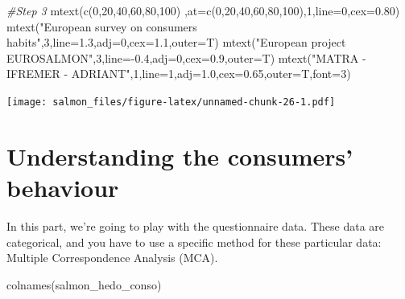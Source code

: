 \documentclass[
]{book}
\newenvironment{Shaded}{\begin{snugshade}}{\end{snugshade}}
\newcommand{\AttributeTok}[1]{\textcolor[rgb]{0.77,0.63,0.00}{#1}}
\newcommand{\CommentTok}[1]{\textcolor[rgb]{0.56,0.35,0.01}{\textit{#1}}}
\newcommand{\DecValTok}[1]{\textcolor[rgb]{0.00,0.00,0.81}{#1}}
\newcommand{\FloatTok}[1]{\textcolor[rgb]{0.00,0.00,0.81}{#1}}
\newcommand{\FunctionTok}[1]{\textcolor[rgb]{0.00,0.00,0.00}{#1}}
\newcommand{\NormalTok}[1]{#1}
\newcommand{\SpecialCharTok}[1]{\textcolor[rgb]{0.00,0.00,0.00}{#1}}
\newcommand{\StringTok}[1]{\textcolor[rgb]{0.31,0.60,0.02}{#1}}
\begin{document}
\begin{Shaded}
\begin{Highlighting}[]
\CommentTok{\#Step 3}
\FunctionTok{mtext}\NormalTok{(}\FunctionTok{c}\NormalTok{(}\DecValTok{0}\NormalTok{,}\DecValTok{20}\NormalTok{,}\DecValTok{40}\NormalTok{,}\DecValTok{60}\NormalTok{,}\DecValTok{80}\NormalTok{,}\DecValTok{100}\NormalTok{) ,}\AttributeTok{at=}\FunctionTok{c}\NormalTok{(}\DecValTok{0}\NormalTok{,}\DecValTok{20}\NormalTok{,}\DecValTok{40}\NormalTok{,}\DecValTok{60}\NormalTok{,}\DecValTok{80}\NormalTok{,}\DecValTok{100}\NormalTok{),}\DecValTok{1}\NormalTok{,}\AttributeTok{line=}\DecValTok{0}\NormalTok{,}\AttributeTok{cex=}\FloatTok{0.80}\NormalTok{)}
\FunctionTok{mtext}\NormalTok{(}\StringTok{"European survey on consumers habits"}\NormalTok{,}\DecValTok{3}\NormalTok{,}\AttributeTok{line=}\FloatTok{1.3}\NormalTok{,}\AttributeTok{adj=}\DecValTok{0}\NormalTok{,}\AttributeTok{cex=}\FloatTok{1.1}\NormalTok{,}\AttributeTok{outer=}\NormalTok{T)}
\FunctionTok{mtext}\NormalTok{(}\StringTok{"European project EUROSALMON"}\NormalTok{,}\DecValTok{3}\NormalTok{,}\AttributeTok{line=}\SpecialCharTok{{-}}\FloatTok{0.4}\NormalTok{,}\AttributeTok{adj=}\DecValTok{0}\NormalTok{,}\AttributeTok{cex=}\FloatTok{0.9}\NormalTok{,}\AttributeTok{outer=}\NormalTok{T) }
\FunctionTok{mtext}\NormalTok{(}\StringTok{"MATRA {-} IFREMER {-} ADRIANT"}\NormalTok{,}\DecValTok{1}\NormalTok{,}\AttributeTok{line=}\DecValTok{1}\NormalTok{,}\AttributeTok{adj=}\FloatTok{1.0}\NormalTok{,}\AttributeTok{cex=}\FloatTok{0.65}\NormalTok{,}\AttributeTok{outer=}\NormalTok{T,}\AttributeTok{font=}\DecValTok{3}\NormalTok{)}
\end{Highlighting}
\end{Shaded}

\texttt{[image: salmon\_files/figure-latex/unnamed-chunk-26-1.pdf]}

\hypertarget{understanding-the-consumers-behaviour}{%
\section{Understanding the consumers' behaviour}\label{understanding-the-consumers-behaviour}}

In this part, we're going to play with the questionnaire data. These data are categorical, and you have to use a specific method for these particular data: Multiple Correspondence Analysis (MCA).

\begin{Shaded}
\begin{Highlighting}[]
\FunctionTok{colnames}\NormalTok{(salmon\_hedo\_conso)}
\end{Highlighting}
\end{Shaded}
\end{document}
